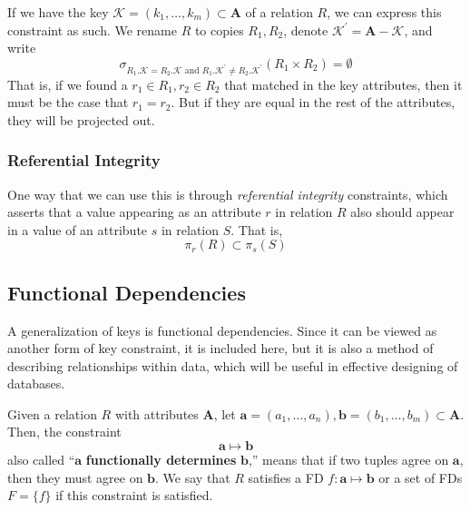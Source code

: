 \documentclass{article}
\begin{document}
      \begin{definition}
        If we have the key $\mathcal{K} = (k_1, \ldots, k_m) \subset \mathbf{A}$ of a relation $R$, we can express this constraint as such. We rename $R$ to copies $R_1, R_2$, denote $\mathcal{K}^\prime = \mathbf{A} - \mathcal{K}$, and write 
        \begin{equation}
          \sigma_{R_1.\mathcal{K} = R_2.\mathcal{K} \text{ and } R_1.\mathcal{K}^\prime \neq R_2.\mathcal{K}^\prime} (R_1 \times R_2) = \emptyset
        \end{equation}
        That is, if we found a $r_1 \in R_1, r_2 \in R_2$ that matched in the key attributes, then it must be the case that $r_1 = r_2$. But if they are equal in the rest of the attributes, they will be projected out. 
      \end{definition}

    \subsubsection{Referential Integrity}

      \begin{definition}
        One way that we can use this is through \textit{referential integrity} constraints, which asserts that a value appearing as an attribute $r$ in relation $R$ also should appear in a value of an attribute $s$ in relation $S$. That is, 
        \begin{equation}
          \pi_r (R) \subset \pi_s (S)
        \end{equation}
      \end{definition}

  \subsection{Functional Dependencies} 

      A generalization of keys is functional dependencies. Since it can be viewed as another form of key constraint, it is included here, but it is also a method of describing relationships within data, which will be useful in effective designing of databases.  

      \begin{definition}
        Given a relation $R$ with attributes $\mathbf{A}$, let $\mathbf{a} = (a_1, \ldots, a_n), \mathbf{b} = (b_1, \ldots, b_m) \subset \mathbf{A}$. Then, the constraint 
        \begin{equation}
          \mathbf{a} \mapsto \mathbf{b}
        \end{equation}
        also called ``$\mathbf{a}$ \textbf{functionally determines} $\mathbf{b}$,'' means that if two tuples agree on $\mathbf{a}$, then they must agree on $\mathbf{b}$. We say that $R$ satisfies a FD $f: \mathbf{a} \mapsto \mathbf{b}$ or a set of FDs $F = \{f\}$ if this constraint is satisfied. 
      \end{definition}
\end{document}
